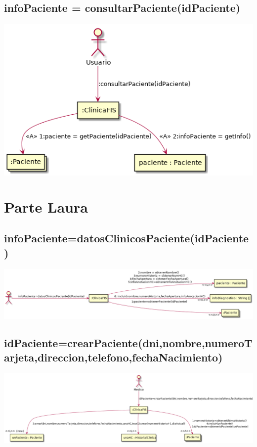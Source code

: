 \documentclass[10pt,a4paper,spanish]{report}
\begin{document}
\subsection*{infoPaciente = consultarPaciente(idPaciente)}
\begin{center}
	\includegraphics[scale=0.6]{infoPaciente.png}
\end{center}



\section*{Parte Laura}

\subsection*{infoPaciente=datosClinicosPaciente(idPaciente)}
\begin{center}
	\includegraphics[scale=0.4]{dl0.png}
\end{center}

\subsection*{idPaciente=crearPaciente(dni,nombre,numeroTarjeta,direccion,telefono,fechaNacimiento)}
\begin{center}
	\includegraphics[scale=0.37]{dlcrear.png}
\end{center}
\end{document}
